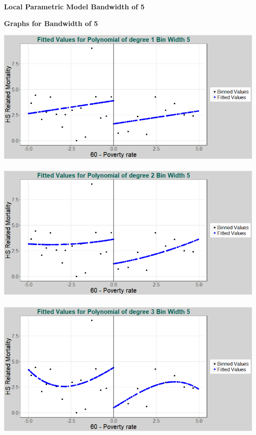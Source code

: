 \documentclass[11pt]{article}
\begin{document}

\begin{center}
	\centering
	\textbf{Local Parametric Model Bandwidth of 5 }\par\medskip
	\scalebox{1}{
		
	}
\end{center}

\begin{center}
	{\large \bf{Graphs for Bandwidth of 5}}
\end{center}

\includegraphics[width=.8\linewidth]{plot_223_poly_1_bw_5.png}
\\ \\
\includegraphics[width=.8\linewidth]{plot_223_poly_2_bw_5.png}
\\ \\
\includegraphics[width=.8\linewidth]{plot_223_poly_3_bw_5.png}


\end{document}
